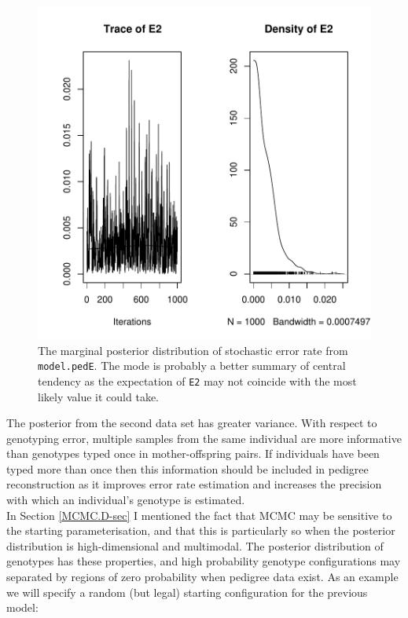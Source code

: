\documentclass{article}
\begin{document}
\begin{figure}[!h]
\begin{center}
\includegraphics{Tutorial-045}
\end{center}
\caption{The marginal posterior distribution of stochastic error rate from \texttt{model.pedE}. The mode is probably a better summary of central tendency as the expectation of \texttt{E2} may not coincide with the most likely value it could take.}
\label{E2-fig}
\end{figure}

The posterior from the second data set has greater variance.  With respect to genotyping error, multiple samples from the same individual are more informative than genotypes typed once in mother-offspring pairs.  If individuals have been typed more than once then this information should be included in pedigree reconstruction as it improves error rate estimation and increases the precision with which an individual's genotype is estimated.\\

In Section \ref{MCMC.D-sec} I mentioned the fact that MCMC may be sensitive to the starting parameterisation, and that this is particularly so when the posterior distribution is high-dimensional and multimodal.  The posterior distribution of genotypes has these properties, and high probability genotype configurations may separated by regions of zero probability when pedigree data exist.  As an example we will specify a random (but legal) starting configuration for the previous model:
\end{document}

